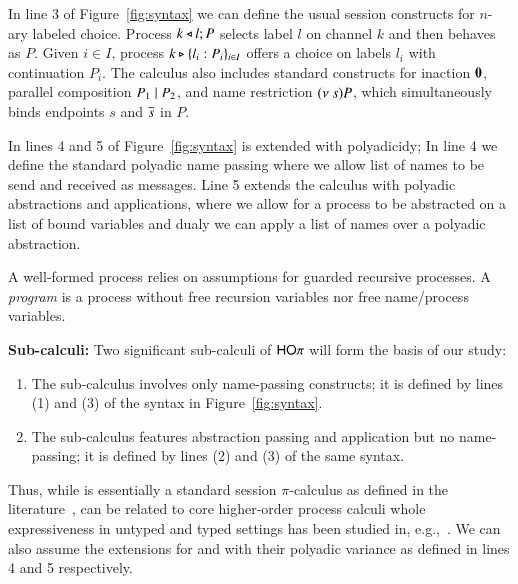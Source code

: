 In line 3 of Figure~\ref{fig:syntax} we can define the usual session
constructs for $n$-ary labeled choice.
Process $k \triangleleft l ; P$ selects label $l$ on channel $k$ and then behaves as $P$. 
Given $i \in I$, 
process $k \triangleright \{l_i:P_i\}_{i \in I}$ offers a choice on labels $l_i$ with
continuation $P_i$.
The calculus also includes standard constructs for 
inaction $\mathbf{0}$, 
parallel composition $P_1 \;|\; P_2$, and 
name restriction $(\nu\ s) P$, which simultaneously binds endpoints $s$ and $\overline{s}$ in $P$.

In lines 4 and 5 of Figure~\ref{fig:syntax} \HOp is extended with polyadicidy;
In line 4 we define the standard polyadic name passing where we allow 
list of names to be send and received as messages. 
Line 5 extends the calculus with polyadic abstractions and applications,
where we allow for a process to be abstracted on a list of
bound variables and dualy we can apply a list of names
over a polyadic abstraction.

A well-formed process relies on assumptions for guarded recursive processes.
A \emph{program} is a process without free 
recursion variables nor free name/process variables.



{\bf Sub-calculi:}
Two significant sub-calculi of $\mathsf{HO}\pi$ will form the basis of our study:
%
\begin{enumerate}[-]
	\item	The sub-calculus \sesp involves only name-passing constructs; it is 
		defined by lines (1) and (3) of the syntax in Figure~\ref{fig:syntax}.

	\item	The sub-calculus \HO features abstraction passing and application but no name-passing; 
		it is defined by lines (2) and (3) of the same syntax.
\end{enumerate}
%
Thus, while \sesp is essentially a standard session $\pi$-calculus as defined in the literature~\cite{},
\HO can be related to core higher-order process calculi whole expressiveness in untyped and typed settings
has been studied in, e.g.,~\cite{}. We can also assume the extensions for \sesp and \HO with their
polyadic variance as defined in lines 4 and 5 respectively.


